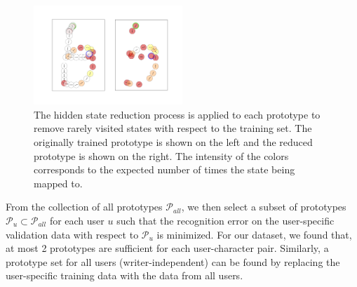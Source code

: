 \documentclass{sigchi}
\begin{document}
\begin{figure}[h]
  \centering
  \includegraphics[width=0.5\textwidth] {figures/state_reduction.png}
  \caption{The hidden state reduction process is applied to each
    prototype to remove rarely visited states with respect to the
    training set. The originally trained prototype is shown on the
    left and the reduced prototype is shown on the right. The
    intensity of the colors corresponds to the expected number of
    times the state being mapped to. }
  \label{fig:state_reduction}
\end{figure}

\newcommand{\prototypeSet}{\mathcal{P}}

From the collection of all prototypes $\prototypeSet_{all}$, we then
select a subset of prototypes $\prototypeSet_u \subset
\prototypeSet_{all}$ for each user $u$ such that the recognition error
on the user-specific validation data with respect to $\prototypeSet_u$
is minimized. For our dataset, we found that, at most 2
prototypes are sufficient for each user-character pair. Similarly, a
prototype set for all users (writer-independent) can be found by
replacing the user-specific training data with the data from all users.

\end{document}
